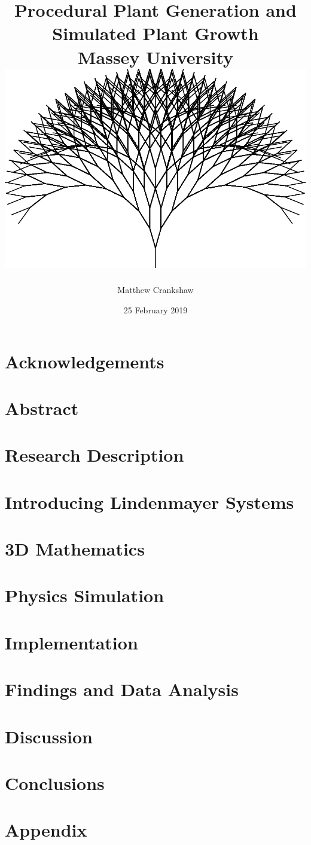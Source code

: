 \documentclass[11pt]{report}
\title{
{ Procedural Plant Generation and Simulated Plant Growth }\\
{\large Massey University}
\\
\vspace{2cm}
{\includegraphics[scale=0.35]{titlepage.png}}
\vspace{2cm}
}
\author{Matthew Crankshaw}
\date{25 February 2019}
\begin{document}
\maketitle

\chapter*{Acknowledgements}

\chapter*{Abstract}

\tableofcontents
\listoffigures


\chapter{Research Description}


\chapter{Introducing Lindenmayer Systems}   


\chapter{3D Mathematics}


\chapter{Physics Simulation}


\chapter{Implementation}


\chapter{Findings and Data Analysis}


\chapter{Discussion}


\chapter{Conclusions}


\printglossary[type=\acronymtype]
\printglossary

\appendix
\chapter{Appendix}

\end{document}
